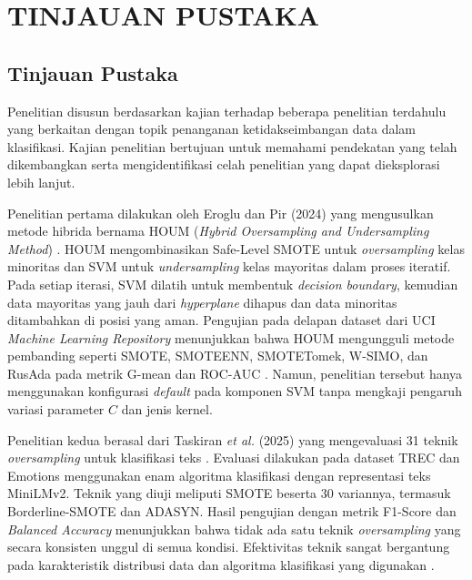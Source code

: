 \newpage
\chapter{TINJAUAN PUSTAKA} \label{Bab II}

\section{Tinjauan Pustaka} \label{II.Tinjauan}
Penelitian disusun berdasarkan kajian terhadap beberapa penelitian terdahulu yang berkaitan dengan topik penanganan ketidakseimbangan data dalam klasifikasi. Kajian penelitian bertujuan untuk memahami pendekatan yang telah dikembangkan serta mengidentifikasi celah penelitian yang dapat dieksplorasi lebih lanjut.

Penelitian pertama dilakukan oleh Eroglu dan Pir (2024) yang mengusulkan metode hibrida bernama HOUM (\textit{Hybrid Oversampling and Undersampling Method}) \cite{Eroglu2024HOUM}. HOUM mengombinasikan Safe-Level SMOTE untuk \textit{oversampling} kelas minoritas dan SVM untuk \textit{undersampling} kelas mayoritas dalam proses iteratif. Pada setiap iterasi, SVM dilatih untuk membentuk \textit{decision boundary}, kemudian data mayoritas yang jauh dari \textit{hyperplane} dihapus dan data minoritas ditambahkan di posisi yang aman. Pengujian pada delapan dataset dari UCI \textit{Machine Learning Repository} menunjukkan bahwa HOUM mengungguli metode pembanding seperti SMOTE, SMOTEENN, SMOTETomek, W-SIMO, dan RusAda pada metrik G-mean dan ROC-AUC \cite{Eroglu2024HOUM}. Namun, penelitian tersebut hanya menggunakan konfigurasi \textit{default} pada komponen SVM tanpa mengkaji pengaruh variasi parameter $C$ dan jenis kernel.

Penelitian kedua berasal dari Taskiran \textit{et al.} (2025) yang mengevaluasi 31 teknik \textit{oversampling} untuk klasifikasi teks \cite{Taskiran2025Oversampling}. Evaluasi dilakukan pada dataset TREC dan Emotions menggunakan enam algoritma klasifikasi dengan representasi teks MiniLMv2. Teknik yang diuji meliputi SMOTE beserta 30 variannya, termasuk Borderline-SMOTE dan ADASYN. Hasil pengujian dengan metrik F1-Score dan \textit{Balanced Accuracy} menunjukkan bahwa tidak ada satu teknik \textit{oversampling} yang secara konsisten unggul di semua kondisi. Efektivitas teknik sangat bergantung pada karakteristik distribusi data dan algoritma klasifikasi yang digunakan \cite{Taskiran2025Oversampling}.

